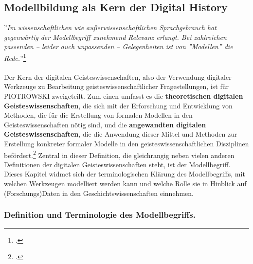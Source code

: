 \documentclass[12pt,a4paper]{article}
\begin{document}
\subsection{Modellbildung als Kern der Digital History}
\label{Modellbildung}
''\textit{Im wissenschaftlichen wie außerwissenschaftlichen Sprachgebrauch hat gegenwärtig der Modellbegriff zunehmend Relevanz erlangt. Bei zahlreichen passenden -- leider auch unpassenden -- Gelegenheiten ist von ''Modellen'' die Rede.}''\footcite[][S.1]{stachowiak1973allgemeine}
\\
\\
Der Kern der digitalen Geisteswissenschaften, also der Verwendung digitaler Werkzeuge zu Bearbeitung geisteswissenschaftlicher Fragestellungen, ist für PIOTROWSKI zweigeteilt. Zum einen umfasst es die \textbf{theoretischen digitalen Geisteswissenschaften}, die sich mit der Erforschung und Entwicklung von Methoden, die für die Erstellung von formalen Modellen in den Geisteswissenschaften nötig sind, und die \textbf{angewandten digitalen Geisteswissenschaften}, die die Anwendung dieser Mittel und Methoden zur Erstellung konkreter formaler Modelle in den geisteswissenschaftlichen Disziplinen befördert.\footcite{piotrowski2016digital} Zentral in dieser Definition, die gleichrangig neben vielen anderen Definitionen der digitalen Geisteswissenschaften steht, ist der Modellbegriff. 
\\
Dieses Kapitel widmet sich der terminologischen Klärung des Modellbegriffs, mit welchen Werkzeugen modelliert werden kann und welche Rolle sie in Hinblick auf (Forschungs)Daten in den Geschichtswissenschaften einnehmen.

\subsubsection{Definition und Terminologie des Modellbegriffs.}
\label{Modell_def}
\end{document}
